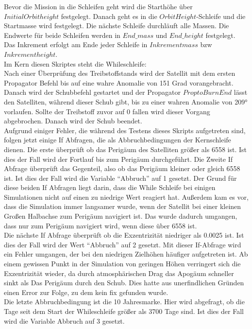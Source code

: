 Bevor die Mission in die Schleifen geht wird die Starthöhe über $Initial Orbitheight$ festgelegt. Danach geht es in die $Orbit Height$-Schleife und die Startmasse wird festgelegt.
Die nächste Schleife durchläuft alle Massen. Die Endwerte für beide Schleifen werden in $End\_mass$ und $End\_height$ festgelegt. Das Inkrement erfolgt am Ende jeder Schleife in $Inkrement mass$ bzw $Inkrement height$.\\
Im Kern diesen Skriptes steht die Whileschleife:\\
Nach einer Überprüfung des Treibstoffstands wird der Satellit mit dem ersten Propagator Befehl bis auf eine wahre Anomalie von 151 Grad vorangebracht. 
Danach wird der Schubbefehl gestartet und der Propagator $ProptoBurnEnd$ lässt den Satelliten, während dieser Schub gibt, bis zu einer wahren Anomalie von 209° vorlaufen. Sollte der Treibstoff zuvor auf 0 fallen wird dieser Vorgang abgebrochen.
Danach wird der Schub beendet.\\
Aufgrund einiger Fehler, die während des Testens dieses Skripts aufgetreten sind, folgen jetzt einige If Abfragen, die als Abbruchbedingungen der Kernschleife dienen.
Die erste überprüft ob das Perigäum des Satelliten größer als 6558 ist. Ist dies der Fall wird der Fortlauf bis zum Perigäum durchgeführt. Die Zweite If Abfrage überprüft das Gegenteil, also ob das Perigäum kleiner oder gleich 6558 ist. Ist dies der Fall wird die Variable “Abbruch” auf 1 gesetzt. Der Grund für diese beiden If Abfragen liegt darin, dass die While Schleife bei einigen Simulationen nicht auf einen zu niedrige Wert reagiert hat. Außerdem kam es vor, dass die Simulation immer langsamer wurde, wenn der Satellit bei einer kleinen Großen Halbachse zum Perigäum navigiert ist. Das wurde dadurch umgangen, dass nur zum Perigäum navigiert wird, wenn diese über 6558 ist. \\
Die nächste If Abfrage überprüft ob die Exzentrizität niedriger als 0.0025 ist. Ist dies der Fall wird der Wert “Abbruch” auf 2 gesetzt. Mit dieser If-Abfrage wird ein Fehler umgangen, der bei den niedrigen Zielhöhen häufiger aufgetreten ist. Ab einem gewissen Punkt in der Simulation von geringen Höhen verringert sich die Exzentrizität wieder, da durch atmosphärischen Drag das Apogäum schneller sinkt als Das Perigäum durch den Schub. Dies hatte aus unerfindlichen Gründen einen Error zur Folge, zu dem kein fix gefunden wurde. \\
Die letzte Abbruchbedingung ist die 10 Jahresmarke. Hier wird abgefragt, ob die Tage seit dem Start der Whileschleife größer als 3700 Tage sind. Ist dies der Fall wird die Variable Abbruch auf 3 gesetzt.\\
